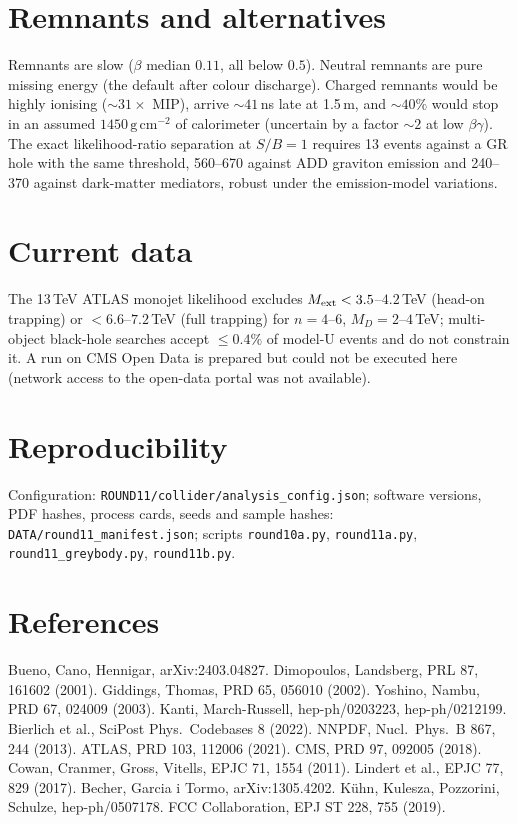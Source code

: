 \documentclass[11pt,a4paper]{article}
\begin{document}
\section{Remnants and alternatives}
Remnants are slow ($\beta$ median $0.11$, all below $0.5$). Neutral remnants are pure missing energy (the default after colour
discharge). Charged remnants would be highly ionising ($\sim31\times$ MIP), arrive $\sim41$\,ns late at 1.5\,m, and $\sim40\%$ would stop
in an assumed $1450\,\mathrm{g\,cm^{-2}}$ of calorimeter (uncertain by a factor $\sim2$ at low $\beta\gamma$). The exact likelihood-ratio
separation at $S/B=1$ requires 13 events against a GR hole with the same threshold, 560--670 against ADD graviton emission and 240--370
against dark-matter mediators, robust under the emission-model variations.

\section{Current data}
The 13\,TeV ATLAS monojet likelihood excludes $M_{\rm ext}<3.5$--$4.2$\,TeV (head-on trapping) or $<6.6$--$7.2$\,TeV (full trapping)
for $n=4$--$6$, $M_D=2$--$4$\,TeV; multi-object black-hole searches accept $\le0.4\%$ of model-U events and do not constrain it.
A run on CMS Open Data is prepared but could not be executed here (network access to the open-data portal was not available).

\section*{Reproducibility}
Configuration: \texttt{ROUND11/collider/analysis\_config.json}; software versions, PDF hashes, process cards, seeds and sample hashes:
\texttt{DATA/round11\_manifest.json}; scripts \texttt{round10a.py}, \texttt{round11a.py}, \texttt{round11\_greybody.py},
\texttt{round11b.py}.

\section*{References}\small
Bueno, Cano, Hennigar, arXiv:2403.04827. Dimopoulos, Landsberg, PRL 87, 161602 (2001). Giddings, Thomas, PRD 65, 056010 (2002).
Yoshino, Nambu, PRD 67, 024009 (2003). Kanti, March-Russell, hep-ph/0203223, hep-ph/0212199. Bierlich et al., SciPost Phys.\ Codebases 8
(2022). NNPDF, Nucl.\ Phys.\ B 867, 244 (2013). ATLAS, PRD 103, 112006 (2021). CMS, PRD 97, 092005 (2018). Cowan, Cranmer, Gross, Vitells,
EPJC 71, 1554 (2011). Lindert et al., EPJC 77, 829 (2017). Becher, Garcia i Tormo, arXiv:1305.4202. K\"uhn, Kulesza, Pozzorini, Schulze,
hep-ph/0507178. FCC Collaboration, EPJ ST 228, 755 (2019).
\end{document}
